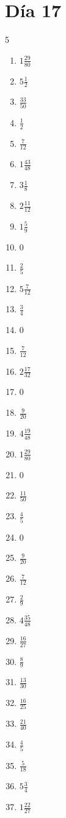 \documentclass[12pt]{article}
\begin{document}
\section*{Día 17}
\begin{multicols}{5}\begin{enumerate}
\item $ 1 \frac{29}{80} $
\item $ 5 \frac{1}{2} $
\item $ \frac{33}{50} $
\item $ \frac{1}{2} $
\item $ \frac{7}{12} $
\item $ 1 \frac{43}{48} $
\item $ 3 \frac{1}{8} $
\item $ 2 \frac{11}{12} $
\item $ 1 \frac{5}{9} $
\item $ 0 $
\item $ \frac{2}{5} $
\item $ 5 \frac{7}{12} $
\item $ \frac{3}{4} $
\item $ 0 $
\item $ \frac{7}{12} $
\item $ 2 \frac{17}{32} $
\item $ 0 $
\item $ \frac{9}{20} $
\item $ 4 \frac{19}{48} $
\item $ 1 \frac{29}{80} $
\item $ 0 $
\item $ \frac{11}{50} $
\item $ \frac{4}{5} $
\item $ 0 $
\item $ \frac{9}{20} $
\item $ \frac{7}{12} $
\item $ \frac{2}{9} $
\item $ 4 \frac{35}{48} $
\item $ \frac{16}{27} $
\item $ \frac{8}{9} $
\item $ \frac{13}{30} $
\item $ \frac{16}{25} $
\item $ \frac{21}{40} $
\item $ \frac{4}{5} $
\item $ \frac{5}{18} $
\item $ 5 \frac{3}{4} $
\item $ 1 \frac{22}{27} $

\end{enumerate}
\end{multicols}
\end{document}
